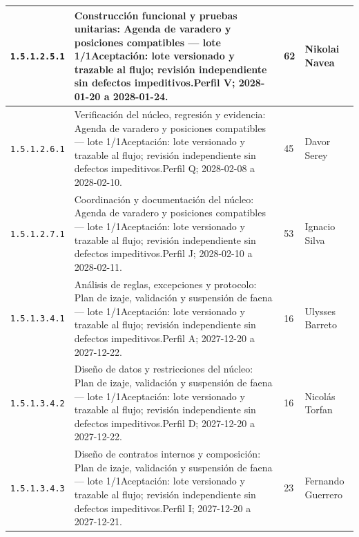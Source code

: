 \begin{longtable}{L{29mm}L{80mm}R{12mm}L{28mm}}
\texttt{1.\allowbreak{}5.\allowbreak{}1.\allowbreak{}2.\allowbreak{}5.\allowbreak{}1} & Construcción funcional y pruebas unitarias: Agenda de varadero y posiciones compatibles — lote 1/1\newline Aceptación: lote versionado y trazable al flujo; revisión independiente sin defectos impeditivos.\newline Perfil V; 2028-01-20 a 2028-01-24. & 62 & Nikolai Navea\\\hline
\texttt{1.\allowbreak{}5.\allowbreak{}1.\allowbreak{}2.\allowbreak{}6.\allowbreak{}1} & Verificación del núcleo, regresión y evidencia: Agenda de varadero y posiciones compatibles — lote 1/1\newline Aceptación: lote versionado y trazable al flujo; revisión independiente sin defectos impeditivos.\newline Perfil Q; 2028-02-08 a 2028-02-10. & 45 & Davor Serey\\\hline
\texttt{1.\allowbreak{}5.\allowbreak{}1.\allowbreak{}2.\allowbreak{}7.\allowbreak{}1} & Coordinación y documentación del núcleo: Agenda de varadero y posiciones compatibles — lote 1/1\newline Aceptación: lote versionado y trazable al flujo; revisión independiente sin defectos impeditivos.\newline Perfil J; 2028-02-10 a 2028-02-11. & 53 & Ignacio Silva\\\hline
\texttt{1.\allowbreak{}5.\allowbreak{}1.\allowbreak{}3.\allowbreak{}4.\allowbreak{}1} & Análisis de reglas, excepciones y protocolo: Plan de izaje, validación y suspensión de faena — lote 1/1\newline Aceptación: lote versionado y trazable al flujo; revisión independiente sin defectos impeditivos.\newline Perfil A; 2027-12-20 a 2027-12-22. & 16 & Ulysses Barreto\\\hline
\texttt{1.\allowbreak{}5.\allowbreak{}1.\allowbreak{}3.\allowbreak{}4.\allowbreak{}2} & Diseño de datos y restricciones del núcleo: Plan de izaje, validación y suspensión de faena — lote 1/1\newline Aceptación: lote versionado y trazable al flujo; revisión independiente sin defectos impeditivos.\newline Perfil D; 2027-12-20 a 2027-12-22. & 16 & Nicolás Torfan\\\hline
\texttt{1.\allowbreak{}5.\allowbreak{}1.\allowbreak{}3.\allowbreak{}4.\allowbreak{}3} & Diseño de contratos internos y composición: Plan de izaje, validación y suspensión de faena — lote 1/1\newline Aceptación: lote versionado y trazable al flujo; revisión independiente sin defectos impeditivos.\newline Perfil I; 2027-12-20 a 2027-12-21. & 23 & Fernando Guerrero\\\hline

\end{longtable}
